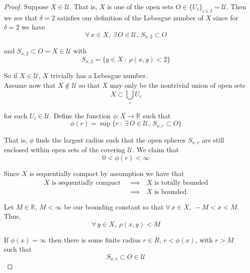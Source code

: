\documentclass[12pt]{article}
\newlength\tindent
\renewcommand{\indent}{\hspace*{\tindent}}
\newcommand{\R}{\mathbb R}
\begin{document}
\begin{proof} Suppose $X \in \mathcal U$. That is, $X$ is one of the open sets $O \in \{U_i\}_{i\in I} = \mathcal U$. Then we see that $\delta = 2$ satisfies our definition of the Lebesgue number of $X$ since for $\delta = 2$ we have
\begin{equation*}
	\forall\,x\in X,~\exists\,O\in\mathcal U,~S_{x,2} \subset O
\end{equation*}

and $S_{x,2} \subset O = X \in \mathcal U$ with
\begin{equation*}
	S_{x,2} = \{y\in X~:~ \rho(x,y) < 2\}
\end{equation*}

So if $X \in \mathcal U$, $X$ trivially has a Lebesgue number. \\

Assume now that $X \notin \mathcal U$ so that $X$ may only be the nontrivial union of open sets
\begin{equation*}
	X \subset \bigcup_i U_i
\end{equation*}

for each $U_i \in \mathcal U$. Define the function $\phi:X\to\R$ such that
\begin{equation*}
	\phi(r) = \sup \{ r ~:~ \exists\,O\in\mathcal U,~ S_{x,r} \subset O \}
\end{equation*}

\indent That is, $\phi$ finds the largest radius such that the open spheres $S_{x,r}$ are still enclosed within open sets of the covering $\mathcal U$. We claim that
\begin{equation*}
	0 < \phi(r) < \infty
\end{equation*}

Since $X$ is sequentially compact by assumption we have that 
\begin{align*}
	\text{$X$ is sequentially compact } &\implies \text{ $X$ is totally bounded} \\
	&\implies \text{ $X$ is bounded.}
\end{align*}

Let $M \in \R$, $M < \infty$ be our bounding constant so that $\forall\,x\in X,~-M < x < M$. Thus,
\begin{equation*}
	\forall\,y\in X,~\rho(x,y) < M
\end{equation*}

If $\phi(x) = \infty$ then there is some finite radius $r \in R$, $r < \phi(x)$, with $r > M$ such that
\begin{equation*}
	S_{x,r} \subset O \in \mathcal U
\end{equation*}


\end{proof}
\end{document}

